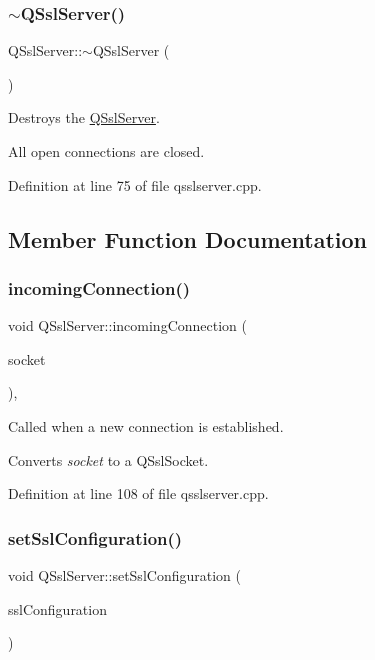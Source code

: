 \subsubsection{\texorpdfstring{$\sim$\+Q\+Ssl\+Server()}{~QSslServer()}}
{\footnotesize\ttfamily Q\+Ssl\+Server\+::$\sim$\+Q\+Ssl\+Server (\begin{DoxyParamCaption}{ }\end{DoxyParamCaption})\hspace{0.3cm}{\ttfamily [virtual]}}

Destroys the \mbox{\hyperlink{class_q_ssl_server}{Q\+Ssl\+Server}}.

All open connections are closed. 

Definition at line 75 of file qsslserver.\+cpp.



\subsection{Member Function Documentation}
\mbox{\label{class_q_ssl_server_a8423ce204b5757e476469257e8a472b6}} 
\subsubsection{\texorpdfstring{incoming\+Connection()}{incomingConnection()}}
{\footnotesize\ttfamily void Q\+Ssl\+Server\+::incoming\+Connection (\begin{DoxyParamCaption}\item[{qintptr}]{socket }\end{DoxyParamCaption})\hspace{0.3cm}{\ttfamily [protected]}, {\ttfamily [virtual]}}

Called when a new connection is established.

Converts {\itshape socket} to a Q\+Ssl\+Socket. 

Definition at line 108 of file qsslserver.\+cpp.

\mbox{\label{class_q_ssl_server_a1bc65d4f411dbbd9256f703f2f21f288}} 
\subsubsection{\texorpdfstring{set\+Ssl\+Configuration()}{setSslConfiguration()}}
{\footnotesize\ttfamily void Q\+Ssl\+Server\+::set\+Ssl\+Configuration (\begin{DoxyParamCaption}\item[{const Q\+Ssl\+Configuration \&}]{ssl\+Configuration }\end{DoxyParamCaption})}

